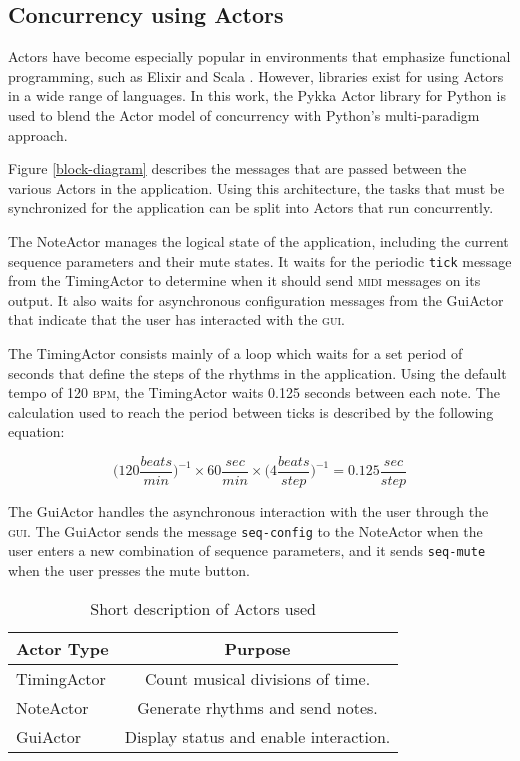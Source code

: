 \documentclass{sig-alternate-05-2015}
\begin{document}
\subsection{Concurrency using Actors}
Actors have become especially popular in environments that emphasize functional programming, such as Elixir and Scala \cite{karmani2009actor}. However, libraries exist for using Actors in a wide range of languages. In this work, the Pykka Actor library for Python is used to blend the Actor model of concurrency with Python's multi-paradigm approach.

Figure \ref{block-diagram} describes the messages that are passed between the various Actors in the application. Using this architecture, the tasks that must be synchronized for the application can be split into Actors that run concurrently. 

The NoteActor manages the logical state of the application, including the current sequence parameters and their mute states. It waits for the periodic \texttt{tick} message from the TimingActor to determine when it should send \textsc{midi} messages on its output. It also waits for asynchronous configuration messages from the GuiActor that indicate that the user has interacted with the \textsc{gui}. 

The TimingActor consists mainly of a loop which waits for a set period of seconds that define the steps of the rhythms in the application. Using the default tempo of 120 \textsc{bpm}, the TimingActor waits 0.125 seconds between each note. The calculation used to reach the period between ticks is described by the following equation:

\begin{equation*}
\bigg(120 \frac{beats}{min} \bigg)^{-1} \times 60 \frac{sec}{min} \times \bigg(4 \frac{beats}{step} \bigg) ^{-1} = 0.125 \frac{sec}{step}
\label{timing-eq}
\end{equation*}

The GuiActor handles the asynchronous interaction with the user through the \textsc{gui}. The GuiActor sends the message \texttt{seq-config} to the NoteActor when the user enters a new combination of sequence parameters, and it sends \texttt{seq-mute} when the user presses the mute button.

\begin{table}
\centering
\caption{Short description of Actors used}
\begin{tabular}{|l|c|} \hline
\textbf{Actor Type} & \textbf{Purpose}\\ \hline \hline
TimingActor & Count musical divisions of time. \\ \hline
NoteActor & Generate rhythms and send notes. \\ \hline
GuiActor & Display status and enable interaction. \\ \hline
\end{tabular}
\end{table}
\end{document}
